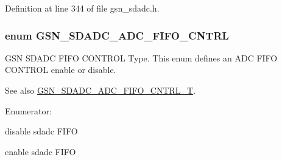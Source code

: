 Definition at line 344 of file gsn\_\-sdadc.h.

\hypertarget{a00652_ga2935ec509d4dbac8b79ee30623d4c11f}{
\subsubsection[{GSN\_\-SDADC\_\-ADC\_\-FIFO\_\-CNTRL}]{\setlength{\rightskip}{0pt plus 5cm}enum {\bf GSN\_\-SDADC\_\-ADC\_\-FIFO\_\-CNTRL}}}
\label{a00652_ga2935ec509d4dbac8b79ee30623d4c11f}


GSN SDADC FIFO CONTROL Type. This enum defines an ADC FIFO CONTROL enable or disable. 

\begin{DoxySeeAlso}{See also}
\hyperlink{a00652_gaf55aace91b55b8544afeb27482cc70d4}{GSN\_\-SDADC\_\-ADC\_\-FIFO\_\-CNTRL\_\-T}. 
\end{DoxySeeAlso}
\begin{Desc}
\item[Enumerator: ]\par
\begin{description}
\item[{\em 
\hypertarget{a00652_gga2935ec509d4dbac8b79ee30623d4c11fa23331713502922b9d65fff5fb5ff0609}{
GSN\_\-SDADC\_\-ADC\_\-FIFO\_\-CNTRL\_\-DISABLE}
\label{a00652_gga2935ec509d4dbac8b79ee30623d4c11fa23331713502922b9d65fff5fb5ff0609}
}]disable sdadc FIFO \item[{\em 
\hypertarget{a00652_gga2935ec509d4dbac8b79ee30623d4c11fa415e5569f69e30fa01e3ecfc0ef4bf32}{
GSN\_\-SDADC\_\-ADC\_\-FIFO\_\-CNTRL\_\-ENABLE}
\label{a00652_gga2935ec509d4dbac8b79ee30623d4c11fa415e5569f69e30fa01e3ecfc0ef4bf32}
}]enable sdadc FIFO \end{description}
\end{Desc}



